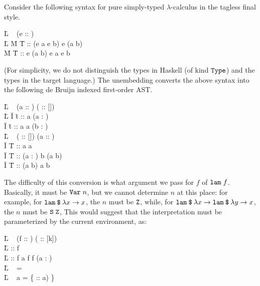 \documentclass{article}
\theoremstyle{definition}
\newlength{\blanklineskip}
\begin{document}
Consider the following syntax for pure simply-typed $\lambda$-calculus in the tagless final style. 
\begin{code}
\=L ~ \A (e ::  \to {}) ~\\
\=L \quad {}
   \=M  \=T :: (e \A a \to e \A b) \to e \A (a \to b) \\
   \=M  \=T :: e \A (a \to b) \to e \A a \to e \A b 
\end{code}
(For simplicity, we do not distinguish the types in Haskell (of kind $\texttt{Type}$) and the types in the target language.) 
The unembedding converts the above syntax into the following de Bruijn indexed first-order AST. 
\begin{code}
\=L \DATA~ \A (a :: ) \A ( :: [])~\WHERE\\
\=L \quad {} 
  \=I  \=t ::  \A a \A (a : ) \\
  \=I  \=t ::  \A a \A {} \to {} \A a \A (b : ) \\[\blanklineskip]
\=L \DATA~ \A ( :: []) \A (a :: ) \WHERE\\
  \=I  \=T ::  \A a \A {} \to {} \A {} \A a \\
  \=I  \=T ::  \A (a : ) \A b \to {} \A {} \A (a \to b) \\
  \=I  \=T ::  \A {} \A (a \to b) \to {} \A {} \A a \to {} \A {} \A b 
\end{code}
The difficulty of this conversion is what argument we pass for $f$ of $\texttt{lam} \; f$. Basically, it must be $\texttt{Var} \; n$, 
but we cannot determine $n$ at this place: for example, 
for $\texttt{lam} \mathbin{\texttt{\$}} \lambda x \to x$, the $n$ must be $\texttt{Z}$, 
while, for $\texttt{lam} \mathbin{\texttt{\$}} \lambda x \to \texttt{lam} \mathbin{\texttt{\$}} \lambda y \to x$, the $n$ must be $\texttt{S} \; \texttt{Z}$, 
This would suggest that the interpretation must be parameterized by the current environment, as:
\begin{code}
\=L ~ \A (f ::  \to {}) \A ( :: [k]) ~\WHERE \\
\=L \quad {} ::  \A f \A [\,] \\
\=L \quad {} :: f \A a \to {} \A f \A {} \to {} \A f \A (a : ) \\[\blanklineskip]%
\=L ~ =  \A {} \\[\blanklineskip]
\=L ~ \A a =  \A \{  ::  \A {} \to {} \A {} \A a) \}
\end{code}
\end{document}
